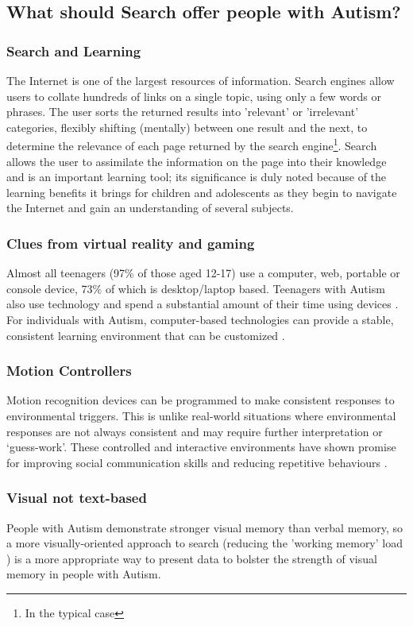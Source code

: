 \documentclass[10pt]{article}
\begin{document}
\subsection{What should Search offer people with Autism?}\label{What should Search offer people with Autism}
\subsubsection{Search and Learning}
The Internet is one of the largest resources of information. Search engines allow users to collate hundreds of links on a single topic, using only a few words or phrases. The user sorts the returned results into 'relevant' or 'irrelevant' categories, flexibly shifting (mentally) between one result and the next, to determine the relevance of each page returned by the search engine\footnote{In the typical case}. Search allows the user to assimilate the information on the page into their knowledge and is an important learning tool; its significance is duly noted because of the learning benefits it brings for children and adolescents as they begin to navigate the Internet and gain an understanding of several subjects. 

\subsubsection{Clues from virtual reality and gaming}
Almost all teenagers (97\% of those aged 12-17) use a computer, web, portable or console device, 73\% of which is desktop/laptop based. Teenagers with Autism also use technology and spend a substantial amount of their time using devices \cite{Shane and Albert}. For individuals with Autism, computer-based technologies can provide a stable, consistent learning environment that can be customized \cite{moore}. 

\subsubsection{Motion Controllers}
Motion recognition devices can be programmed to make consistent responses to environmental triggers. This is unlike real-world situations where environmental responses are not always consistent and may require further interpretation or ‘guess-work’. These controlled and interactive environments have shown promise for improving social communication skills and reducing repetitive behaviours \cite{gameshealth}.

\subsubsection{Visual not text-based}
People with Autism demonstrate stronger visual memory \cite{fabienne} than verbal memory, so a more visually-oriented approach to search (reducing the 'working memory' load \cite{workingmem}) is a more appropriate way to present data to bolster the strength of visual memory in people with Autism.
\end{document}
